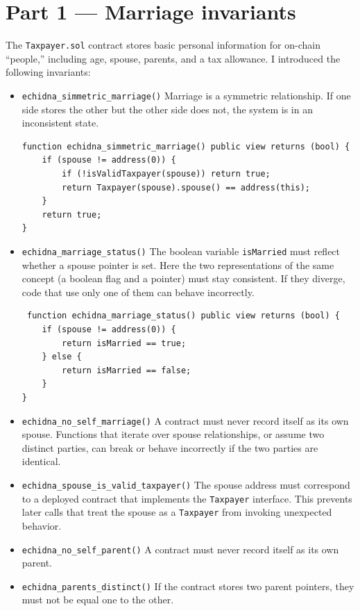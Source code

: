 \section{Part 1 — Marriage invariants}
The \texttt{Taxpayer.sol} contract stores basic personal information for on-chain “people,” including age, spouse, parents, and a tax allowance. I introduced the following invariants:

\begin{itemize}
    \item \texttt{echidna\_simmetric\_marriage()} Marriage is a symmetric relationship. If one side stores the other but the other side does not, the system is in an inconsistent state.

    \begin{lstlisting}
function echidna_simmetric_marriage() public view returns (bool) {
    if (spouse != address(0)) {
        if (!isValidTaxpayer(spouse)) return true;
        return Taxpayer(spouse).spouse() == address(this);
    }
    return true;    
}
    \end{lstlisting}
    
    \item \texttt{echidna\_marriage\_status()} The boolean variable \texttt{isMarried} must reflect whether a spouse pointer is set. Here the two representations of the same concept (a boolean flag and a pointer) must stay consistent. If they diverge, code that use only one of them can behave incorrectly.

    \begin{lstlisting}
 function echidna_marriage_status() public view returns (bool) {
    if (spouse != address(0)) {
        return isMarried == true;
    } else {
        return isMarried == false;
    }
}
    \end{lstlisting}
    
    \item \texttt{echidna\_no\_self\_marriage()} A contract must never record itself as its own spouse. Functions that iterate over spouse relationships, or assume two distinct parties, can break or behave incorrectly if the two parties are identical.
    \item \texttt{echidna\_spouse\_is\_valid\_taxpayer()} 
    The spouse address must correspond to a deployed contract that implements the \texttt{Taxpayer} interface. This prevents later calls that treat the spouse as a \texttt{Taxpayer} from invoking unexpected behavior.  
    \item \texttt{echidna\_no\_self\_parent()} A contract must never record itself as its own parent.
    \item \texttt{echidna\_parents\_distinct()} If the contract stores two parent pointers, they must not be equal one to the other.
\end{itemize}

